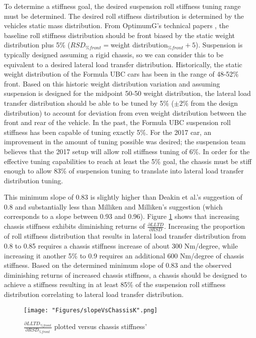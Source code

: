 \documentclass[a4paper]{article}
\numberwithin{equation}{section}
\begin{document}
To determine a stiffness goal, the desired suspension roll stiffness tuning range must be determined. The desired roll stiffness distribution is determined by the vehicles static mass distribution. From OptimumG's technical papers \cite{OptimumG}, the baseline roll stiffness distribution should be front biased by the static weight distribution plus 5\% ($RSD_{\%front} = $weight distribution$_{\%front} + 5$). Suspension is typically designed assuming a rigid chassis, so we can consider this to be equivalent to a desired lateral load transfer distribution. Historically, the static weight distribution of the Formula UBC cars has been in the range of 48-52\% front. Based on this historic weight distribution variation and assuming suspension is designed for the midpoint 50-50 weight distribution, the lateral load transfer distribution should be able to be tuned by 5\% ($\pm2\%$ from the design distribution) to account for deviation from even weight distribution between the front and rear of the vehicle. In the past, the Formula UBC suspension roll stiffness has been capable of tuning exactly 5\%. For the 2017 car, an improvement in the amount of tuning possible was desired; the suspension team believes that the 2017 setup will allow roll stiffness tuning of 6\%. In order for the effective tuning capabilities to reach at least the 5\% goal, the chassis must be stiff enough to allow 83\% of suspension tuning to translate into lateral load transfer distribution tuning.

This minimum slope of 0.83 is slightly higher than Deakin et al.'s suggestion of 0.8 and substantially less than Milliken and Milliken's suggestion (which corresponds to a slope between 0.93 and 0.96). Figure \ref{fig: slopeVsChassisK} shows that increasing chassis stiffness exhibits diminishing returns of $\frac{\partial LLTD}{\partial RSD}$. Increasing the proportion of roll stiffness distribution that results in lateral load transfer distribution from 0.8 to 0.85 requires a chassis stiffness increase of about 300 Nm/degree, while increasing it another 5\% to 0.9 requires an additional 600 Nm/degree of chassis stiffness. Based on the determined minimum slope of 0.83 and the observed diminishing returns of increased chassis stiffness, a chassis should be designed to achieve a stiffness resulting in at least 85\% of the suspension roll stiffness distribution correlating to lateral load transfer distribution. 

\begin{figure}[h]
	\begin{center}
		\texttt{[image: "Figures/slopeVsChassisK".png]}
	\end{center}
	
	\caption{$\frac{\partial LLTD_{\% front}}{\partial RSD_{\% front}}$ plotted versus chassis stiffness'}
	\label{fig: slopeVsChassisK}
\end{figure}
\end{document}
